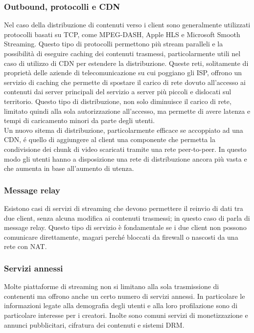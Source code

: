		\subsubsection{Outbound, protocolli e \gls{CDN}}
			Nel caso della distribuzione di contenuti verso i client sono generalmente utilizzati protocolli basati su TCP, come MPEG-DASH, Apple HLS e Microsoft Smooth Streaming. Questo tipo di protocolli permettono più stream paralleli e la possibilità di eseguire caching dei contenuti trasmessi, particolarmente utili nel caso di utilizzo di \gls{CDN} per estendere la distribuzione. Queste reti, solitamente di proprietà delle aziende di telecomunicazione su cui poggiano gli ISP, offrono un servizio di caching che permette di spostare il carico di rete dovuto all'accesso ai contenuti dai server principali del servizio a server più piccoli e dislocati sul territorio. Questo tipo di distribuzione, non solo diminuisce il carico di rete, limitato quindi alla sola autorizzazione all'accesso, ma permette di avere latenza e tempi di caricamento minori da parte degli utenti.
			\\
			Un nuovo sitema di distribuzione, particolarmente efficace se accoppiato ad una CDN, é quello di aggiungere al client una componente che permetta la condivisione dei chunk di video scaricati tramite una rete peer-to-peer. In questo modo gli utenti hanno a disposizione una rete di distribuzione ancora più vasta e che aumenta in base all'aumento di utenza.

		\subsubsection{Message relay}
			Esistono casi di servizi di streaming che devono permettere il reinvio di dati tra due client, senza alcuna modifica ai contenuti trasmessi; in questo caso di parla di message relay. Questo tipo di servizio è fondamentale se i due client non possono comunicare direttamente, magari perché bloccati da firewall o nascosti da una rete con NAT.\@

		\subsubsection{Servizi annessi}
			Molte piattaforme di streaming non si limitano alla sola trasmissione di contenenti ma offrono anche un certo numero di servizi annessi. In particolare le informazioni legate alla demografia degli utenti e alla loro profilazione sono di particolare interesse per i creatori. Inolte sono comuni servizi di monetizzazione e annunci pubblicitari, cifratura dei contenuti e sistemi DRM.\@


